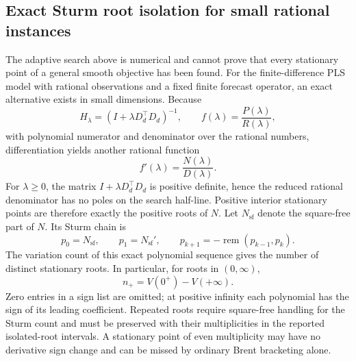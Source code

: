 \documentclass[english]{smcca}
\begin{document}
\subsection{Exact Sturm root isolation for small rational instances}
\label{sec:sturm}

The adaptive search above is numerical and cannot prove that every
stationary point of a general smooth objective has been found. For
the finite-difference PLS model with rational observations and a
fixed finite forecast operator, an exact alternative exists in
small dimensions. Because
\begin{equation}
\label{eq:sturm_rational}
H_{\lambda}=(I+\lambda D_d^\top D_d)^{-1},
\qquad
f(\lambda)=\frac{P(\lambda)}{R(\lambda)},
\end{equation}
with polynomial numerator and denominator over the rational
numbers, differentiation yields another rational function
\begin{equation}
\label{eq:sturm_derivative}
f'(\lambda)=\frac{N(\lambda)}{D(\lambda)}.
\end{equation}
For $\lambda\ge0$, the matrix $I+\lambda D_d^\top D_d$
is positive definite, hence the reduced rational
denominator has no poles on the search half-line. Positive
interior stationary points are therefore exactly the positive
roots of $N$. Let $N_{\mathrm{sf}}$ denote the square-free part of $N$.
Its Sturm chain \cite{basu2006algorithms} is
\begin{equation}
\label{eq:sturm_chain}
p_0=N_{\mathrm{sf}},\qquad p_1=N_{\mathrm{sf}}',\qquad
p_{k+1}=-\operatorname{rem}(p_{k-1},p_k).
\end{equation}
The variation count of this exact polynomial sequence gives
the number of distinct stationary roots. In particular, for roots in $(0,\infty)$,
\begin{equation}
\label{eq:sturm_count}
n_{+}=V(0^+)-V(+\infty).
\end{equation}
Zero entries in a sign list are omitted; at positive infinity
each polynomial has the sign of its leading coefficient.
Repeated roots require square-free handling for the Sturm
count and must be preserved with their multiplicities in the
reported isolated-root intervals. A stationary point of even
multiplicity may have no derivative sign change and can be
missed by ordinary Brent bracketing alone.
\end{document}
